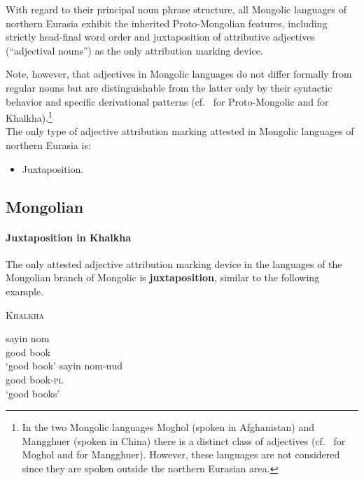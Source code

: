 \noindent With regard to their principal noun phrase structure, all Mongolic languages of northern Eurasia exhibit the inherited Proto-Mongolian features, including strictly head-final word order and juxtaposition of attributive adjectives (“adjectival nouns”) as the only attribution marking device.

Note, however, that adjectives in Mongolic languages do not differ formally from regular nouns but are distinguishable from the latter only by their syntactic behavior and specific derivational patterns (cf.~\citealt[10]{janhunen2003b} for Proto-Mongolic and \citealt[161]{svantesson2003} for Khalkha).\footnote{In the two Mongolic languages Moghol (spoken in Afghanistan) and Mangghuer (spoken in China) there is a distinct class of adjectives (cf.~\citealt[252]{weiers2003} for Moghol and \citealt[311]{slater2003} for Mangghuer). However, these languages are not considered since they are spoken outside the northern Eurasian area.}\\

\noindent The only type of adjective attribution marking attested in Mongolic languages of northern Eurasia is:
\begin{itemize}
\item Juxtaposition.
\end{itemize}

\subsection{Mongolian}
\paragraph{Juxtaposition in Khalkha}
The only attested adjective attribution marking device in the languages of the Mongolian branch of Mongolic is \textbf{juxtaposition}, similar to the following example. 
\begin{exe}
\ex \textsc{Khalkha} \citep{svantesson2003} \label{khalkha juxt}
\begin{xlist}
\ex
\gll	sayin nom\\
	good book\\
\glt	‘good book’
\ex 
\gll	sayin nom-uud\\
	good book-\textsc{pl}\\
\glt ‘good books’
\end{xlist}
\end{exe}


